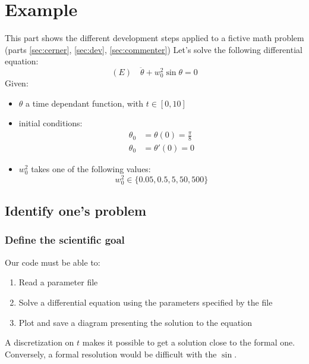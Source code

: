\documentclass[11pt]{article}
\begin{document}
	\section{Example}
		This part shows the different development steps applied to a fictive math problem (parts \ref{sec:cerner}, \ref{sec:dev}, \ref{sec:commenter})
		Let's solve the following differential equation:
		\begin{equation}
		(E)
			\quad \ddot{\theta} + w_0^2 \sin \theta = 0
			\label{eq:diff}
		\end{equation}
		Given:
		\begin{itemize}
			\setlength\itemsep{0pt}
			\item $\theta$ a time dependant function, with $t \in [0, 10]$
			\item initial conditions:
			\begin{align}
				\theta_0&=\theta(0)=\frac{\pi}{8}  \\
				\theta_0&=\theta'(0)=0
			\end{align}
			\item $w_0^2$  takes one of the following values:
			\begin{equation}
				w_0^2 \in \{0.05, 0.5, 5, 50, 500\}
			\end{equation}
		\end{itemize}

		\subsection{Identify one's problem}

			\subsubsection{Define the scientific goal}
				Our code must be able to:
				\begin{enumerate}
					\setlength\itemsep{0pt}
					\item Read a parameter file
					\item Solve a differential equation using the parameters specified by the file
					\item Plot and save a diagram presenting the solution to the equation
				\end{enumerate}

				A discretization on $t$ makes it possible to get a solution close to the formal one.
				Conversely, a formal resolution would be difficult with the $\sin$. \\
\end{document}

